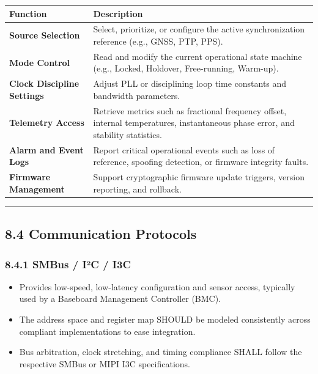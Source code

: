 \documentclass[
]{article}
\newcounter{none} %
\begin{document}
{\def\LTcaptype{none} %
\begin{longtable}[]{@{}
  >{\raggedright\arraybackslash}p{}
  >{\raggedright\arraybackslash}p{}@{}}
\toprule\noalign{}
Function & Description \\
\midrule\noalign{}
\endhead
\bottomrule\noalign{}
\endlastfoot
\textbf{Source Selection} & Select, prioritize, or configure the active
synchronization reference (e.g., GNSS, PTP, PPS). \\
\textbf{Mode Control} & Read and modify the current operational state
machine (e.g., Locked, Holdover, Free-running, Warm-up). \\
\textbf{Clock Discipline Settings} & Adjust PLL or disciplining loop
time constants and bandwidth parameters. \\
\textbf{Telemetry Access} & Retrieve metrics such as fractional
frequency offset, internal temperatures, instantaneous phase error, and
stability statistics. \\
\textbf{Alarm and Event Logs} & Report critical operational events such
as loss of reference, spoofing detection, or firmware integrity
faults. \\
\textbf{Firmware Management} & Support cryptographic firmware update
triggers, version reporting, and rollback. \\
\end{longtable}
}

\begin{center}\rule{0.5\linewidth}{0.5pt}\end{center}

\subsection{8.4 Communication Protocols}\label{communication-protocols}

\subsubsection{8.4.1 SMBus / I²C / I3C}\label{smbus-iuxb2c-i3c}

\begin{itemize}
\item
  Provides low-speed, low-latency configuration and sensor access,
  typically used by a Baseboard Management Controller (BMC).
\item
  The address space and register map SHOULD be modeled consistently
  across compliant implementations to ease integration.
\item
  Bus arbitration, clock stretching, and timing compliance SHALL follow
  the respective SMBus or MIPI I3C specifications.
\end{itemize}
\end{document}
